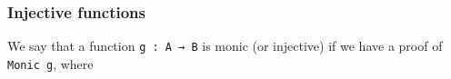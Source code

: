 \begin{code}%
\>[0]\<%
\\
\>[0][@{}l@{\AgdaIndent{1}}]%
\>[1]\AgdaSpace{}%
\AgdaSymbol{:}%
\>[262I]\AgdaSpace{}%
\AgdaSpace{}%
\AgdaSpace{}%
\AgdaSpace{}%
\AgdaSymbol{\{}\AgdaSpace{}%
\AgdaSymbol{:}\AgdaSpace{}%
\AgdaSpace{}%
\AgdaSpace{}%
\AgdaSymbol{\}}\AgdaSpace{}%
\AgdaSymbol{\{}\AgdaSpace{}%
\AgdaSymbol{:}\AgdaSpace{}%
\AgdaSpace{}%
\AgdaSpace{}%
\AgdaSymbol{\}}\<%
\\
\>[.][@{}l@{}]\<[262I]%
\>[21]\AgdaSymbol{(}\AgdaSpace{}%
\AgdaSymbol{:}\AgdaSpace{}%
\AgdaSpace{}%
\AgdaSpace{}%
\AgdaSymbol{)}%
\>[34]\AgdaSymbol{(}\AgdaSpace{}%
\AgdaSymbol{:}\AgdaSpace{}%
\AgdaSpace{}%
\AgdaSymbol{)}\<%
\\
%
\>[21]\AgdaComment{----------------------------}\<%
\\
\>[1][@{}l@{\AgdaIndent{0}}]%
\>[2]%
\>[22]\AgdaSpace{}%
\AgdaSpace{}%
\AgdaSymbol{(}\AgdaSpace{}%
\AgdaSpace{}%
\AgdaSymbol{)}\AgdaSpace{}%
\AgdaSpace{}%
\AgdaSpace{}%
\<%
\\
%
\\[\AgdaEmptyExtraSkip]%
%
\>[1]\AgdaSpace{}%
\AgdaSpace{}%
\AgdaSpace{}%
\AgdaSpace{}%
\AgdaSymbol{=}\AgdaSpace{}%
\AgdaSpace{}%
\AgdaSpace{}%
\AgdaSpace{}%
\AgdaSpace{}%
\AgdaSpace{}%
\AgdaSpace{}%
\AgdaSpace{}%
\AgdaSymbol{(}\AgdaSpace{}%
\AgdaSymbol{))}\<%
\\
\>[0]\<%
\end{code}

\subsubsection{Injective functions}\label{injective-functions}

We say that a function \texttt{g\ :\ A\ →\ B} is monic (or injective) if
we have a proof of \texttt{Monic\ g}, where

